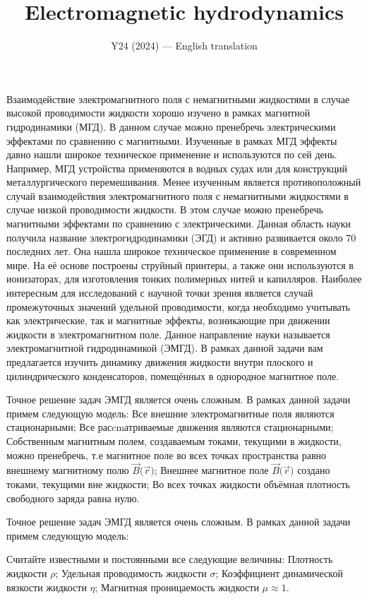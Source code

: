 \documentclass[11pt,a4paper]{article}
\title{\textbf{Electromagnetic hydrodynamics}}
\author{\normalsize Y24 (2024) --- English translation}
\date{}
\begin{document}
\maketitle

Взаимодействие электромагнитного поля с немагнитными жидкостями в случае высокой проводимости жидкости хорошо изучено в рамках магнитной гидродинамики (МГД). В данном случае можно пренебречь электрическими эффектами по сравнению с магнитными. Изученные в рамках МГД эффекты давно нашли широкое техническое применение и используются по сей день. Например, МГД устройства применяются в водных судах или для конструкций металлургического перемешивания. Менее изученным является противоположный случай взаимодействия электромагнитного поля с немагнитными жидкостями в случае низкой проводимости жидкости. В этом случае можно пренебречь магнитными эффектами по сравнению с электрическими. Данная область науки получила название электрогидродинамики (ЭГД) и активно развивается около 70 последних лет. Она нашла широкое техническое применение в современном мире. На её основе построены струйный принтеры, а также они используются в ионизаторах, для изготовления тонких полимерных нитей и капилляров. Наиболее интересным для исследований с научной точки зрения является случай промежуточных значений удельной проводимости, когда необходимо учитывать как электрические, так и магнитные эффекты, возникающие при движении жидкости в электромагнитном поле. Данное направление науки называется электромагнитной гидродинамикой (ЭМГД). В рамках данной задачи вам предлагается изучить динамику движения жидкости внутри плоского и цилиндрического конденсаторов, помещённых в однородное магнитное поле.

Точное решение задач ЭМГД является очень сложным. В рамках данной задачи примем следующую модель: Все внешние электромагнитные поля являются стационарными; Все расcmатриваемые движения являются стационарными; Собственным магнитным полем, создаваемым токами, текущими в жидкости, можно пренебречь, т.е магнитное поле во всех точках пространства равно внешнему магнитному полю $\vec{B}\bigl(\vec{r}\bigr)$; Внешнее магнитное поле $\vec{B}\bigl(\vec{r}\bigr)$ создано токами, текущими вне жидкости; Во всех точках жидкости объёмная плотность свободного заряда равна нулю.

Точное решение задач ЭМГД является очень сложным. В рамках данной задачи примем следующую модель:

Считайте известными и постоянными все следующие величины: Плотность жидкости $\rho$; Удельная проводимость жидкости $\sigma$; Коэффициент динамической вязкости жидкости $\eta$; Магнитная проницаемость жидкости $\mu\approx 1$.
\end{document}
